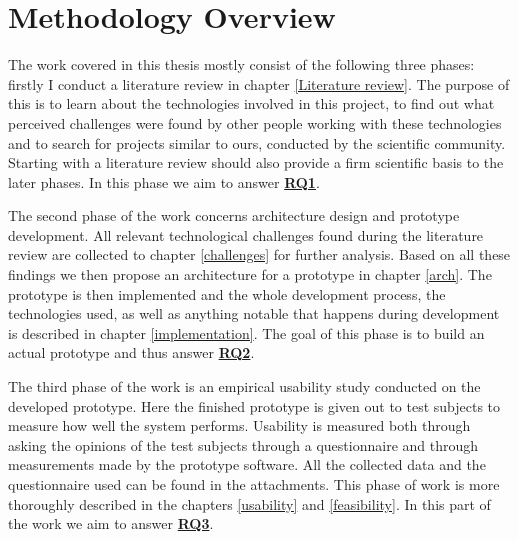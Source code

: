 \section{Methodology Overview} \label{meth}
The work covered in this thesis mostly consist of the following three phases: 
firstly I conduct a literature review in chapter \ref{Literature review}. The 
purpose of this is to learn about the technologies involved in this project, 
to find out what perceived challenges were found by other people working with 
these technologies and to search for projects similar to ours, conducted by the 
scientific community. Starting with a literature review should also provide a 
firm scientific basis to the later phases. In this phase we aim to answer 
\hyperref[rq1]{\textbf{RQ1}}.\par
	The second phase of the work concerns architecture design and prototype 
development. All relevant technological challenges found during the literature 
review are collected to chapter \ref{challenges} for further analysis. Based 
on all these findings we then propose an architecture for a prototype in 
chapter \ref{arch}. The prototype is then implemented and the whole 
development process, the technologies used, as well as anything notable that 
happens during development is described in chapter \ref{implementation}. The 
goal of this phase is to build an actual prototype and thus answer 
\hyperref[rq2]{\textbf{RQ2}}.\par
	The third phase of the work is an empirical usability study conducted 
on the developed prototype. Here the finished prototype is given out to test 
subjects to measure how well the system performs. Usability is measured both 
through asking the opinions of the test subjects through a questionnaire and 
through measurements made by the prototype software. All the collected data and 
the questionnaire used can be found in the attachments. This phase of work is 
more thoroughly described in the chapters \ref{usability} and 
\ref{feasibility}. In this part of the work we aim to answer 
\hyperref[rq3]{\textbf{RQ3}}.
